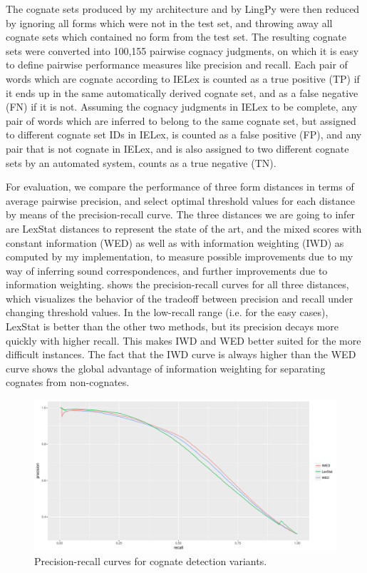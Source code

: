 The cognate sets produced by my architecture and by LingPy were then reduced by ignoring all forms which were not in the test set, and throwing away all cognate sets which contained no form from the test set. The resulting cognate sets were converted into 100,155 pairwise cognacy judgments, on which it is easy to define pairwise performance measures like precision and recall. Each pair of words which are cognate according to IELex is counted as a true positive (TP) if it ends up in the same automatically derived cognate set, and as a false negative (FN) if it is not. Assuming the cognacy judgments in IELex to be complete, any pair of words which are inferred to belong to the same cognate set, but assigned to different cognate set IDs in IELex, is counted as a false positive (FP), and any pair that is not cognate in IELex, and is also assigned to two different cognate sets by an automated system, counts as a true negative (TN).

For evaluation, we compare the performance of three form distances in terms of average pairwise precision, and select optimal threshold values for each distance by means of the precision-recall curve. The three distances we are going to infer are LexStat distances to represent the state of the art, and the mixed scores with constant information (WED) as well as with information weighting (IWD) as computed by my implementation, to measure possible improvements due to my way of inferring sound correspondences, and further improvements due to information weighting.  shows the precision-recall curves for all three distances, which visualizes the behavior of the tradeoff between precision and recall under changing threshold values. In the low-recall range (i.e. for the easy cases), LexStat is better than the other two methods, but its precision decays more quickly with higher recall. This makes IWD and WED better suited for the more difficult instances. The fact that the IWD curve is always higher than the WED curve shows the global advantage of information weighting for separating cognates from non-cognates.

\begin{figure}[ht]
\includegraphics[width=\textwidth]{figures/precision-recall-curves.pdf}
\caption{Precision-recall curves for cognate detection variants.}
\label{precision-recall-curves}
\end{figure}

